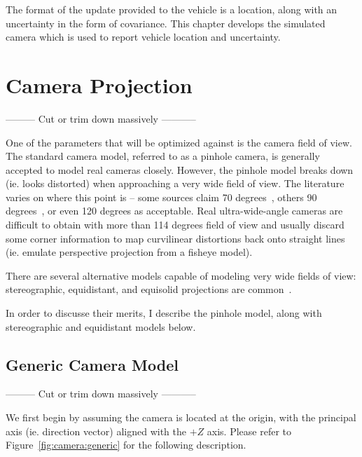 \documentclass[a4paper,12pt,twoside,openright]{report}
\begin{document}
The format of the update provided to the vehicle is a location,
along with an uncertainty in the form of covariance. This chapter
develops the simulated camera which is used to report vehicle 
location and uncertainty.

\section{Camera Projection}
 --------- Cut or trim down massively -----------
 
One of the parameters that will be optimized against is the camera
field of view. The standard camera model, referred to as a 
pinhole camera, is generally accepted to model real cameras
closely. However, the pinhole model breaks down (ie. looks distorted) when approaching
a very wide field of view. The literature varies on where this point is --
some sources claim 70 degrees~\cite{sharpless2010pannini}, others 90 degrees~\cite{fleckperspective},
or even 120 degrees as acceptable. Real ultra-wide-angle cameras
are difficult to obtain with more than 114 degrees field of view and usually discard some corner information
to map curvilinear distortions back onto straight lines (ie. emulate
perspective projection from a fisheye model).


There are several alternative models capable of modeling
very wide fields of view: stereographic, equidistant, and 
equisolid projections are common~\cite{kannala2006generic}.

In order to discusse their merits, I describe the pinhole model,
along with stereographic and equidistant models below.

\subsection{Generic Camera Model}
 --------- Cut or trim down massively -----------

We first begin by assuming the camera is located at the origin,
with the principal axis (ie. direction vector) aligned with the $+Z$ axis.
Please refer to Figure~\ref{fig:camera:generic} for the following description.
\end{document}
